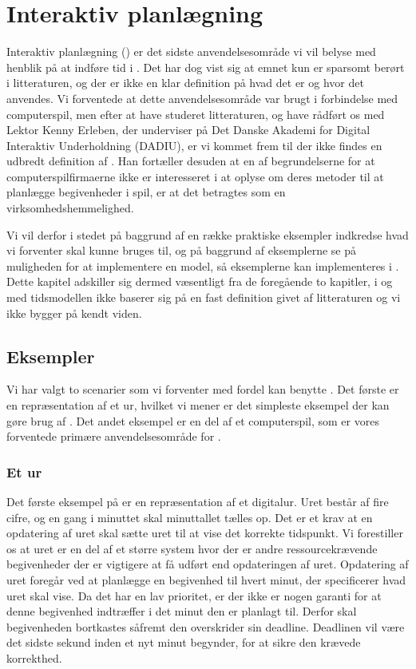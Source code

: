 \chapter{Interaktiv planlægning}
\label{chap:is}

Interaktiv planlægning (\is) er det sidste anvendelsesområde vi vil belyse med henblik på at indføre tid i \pycsp. Det har dog vist sig at emnet kun er sparsomt berørt i litteraturen, og der er ikke en klar definition på hvad det er og hvor det anvendes. 
Vi forventede at dette anvendelsesområde var brugt i forbindelse med computerspil, men efter at have studeret litteraturen, og have rådført os med Lektor Kenny Erleben, der underviser på Det Danske Akademi for Digital Interaktiv Underholdning (DADIU), er vi kommet frem til der ikke findes en udbredt definition af \is. Han fortæller desuden at en af begrundelserne for at computerspilfirmaerne ikke er interesseret i at oplyse om deres metoder til at planlægge begivenheder i spil, er at det  betragtes som en  virksomhedshemmelighed. 

Vi vil derfor i stedet på baggrund af en række praktiske eksempler indkredse hvad vi forventer \is skal kunne bruges til, og på baggrund af eksemplerne se på muligheden for at implementere en model, så eksemplerne kan implementeres i \pycsp. Dette kapitel adskiller sig dermed væsentligt fra de foregående to kapitler, i og med tidsmodellen ikke baserer sig på en fast definition givet af litteraturen og vi ikke bygger på kendt viden.

\section{Eksempler}
Vi har valgt to scenarier som vi forventer med fordel kan benytte \is. Det første er en repræsentation af et ur, hvilket vi mener er det simpleste eksempel der kan gøre brug af \is. Det andet eksempel er en del af et computerspil, som er vores forventede primære anvendelsesområde for \is. 

\subsection{Et ur}
Det første eksempel på \is er en repræsentation af et digitalur. Uret består af fire cifre, og en gang i minuttet skal minuttallet tælles op. Det er et  krav at en opdatering af uret skal sætte uret til at vise det korrekte tidspunkt. Vi forestiller os at uret er en del af et større system hvor der er andre ressourcekrævende begivenheder der er vigtigere at få udført end opdateringen af uret. Opdatering af uret foregår ved at planlægge en begivenhed til hvert minut, der specificerer hvad uret skal vise. Da det har en lav prioritet, er der ikke er nogen garanti for at denne begivenhed indtræffer i det minut den er planlagt til. Derfor skal begivenheden  bortkastes såfremt den overskrider sin deadline. Deadlinen vil være det sidste sekund inden et nyt minut begynder, for at sikre den krævede korrekthed. 

